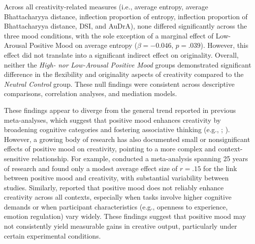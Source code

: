 \documentclass[../MA_Thesis.tex]{subfiles}
\begin{document}
Across all creativity-related measures (i.e., average entropy, average Bhattacharyya distance, inflection proportion of entropy, inflection proportion of Bhattacharyya distance, DSI, and AuDrA), none differed significantly across the three mood conditions, with the sole exception of a marginal effect of Low-Arousal Positive Mood on average entropy ($\beta = -0.046$, $p = .039$). However, this effect did not translate into a significant indirect effect on originality. Overall, neither the \textit{High- nor Low-Arousal Positive Mood} groups demonstrated significant difference in the flexibility and originality aspects of creativity compared to the \textit{Neutral Control} group. These null findings were consistent across descriptive comparisons, correlation analyses, and mediation models.

These findings appear to diverge from the general trend reported in previous meta-analyses, which suggest that positive mood enhances creativity by broadening cognitive categories and fostering associative thinking (e.g., \cite{davis_understanding_2009}; \cite{fredrickson_role_2001}). However, a growing body of research has also documented small or nonsignificant effects of positive mood on creativity, pointing to a more complex and context-sensitive relationship. For example, \textcite{baas_meta-analysis_2008} conducted a meta-analysis spanning 25 years of research and found only a modest average effect size of $r = .15$ for the link between positive mood and creativity, with substantial variability between studies. Similarly, \textcite{zenasni_effects_2002} reported that positive mood does not reliably enhance creativity across all contexts, especially when tasks involve higher cognitive demands or when participant characteristics (e.g., openness to experience, emotion regulation) vary widely. These findings suggest that positive mood may not consistently yield measurable gains in creative output, particularly under certain experimental conditions.
\end{document}
